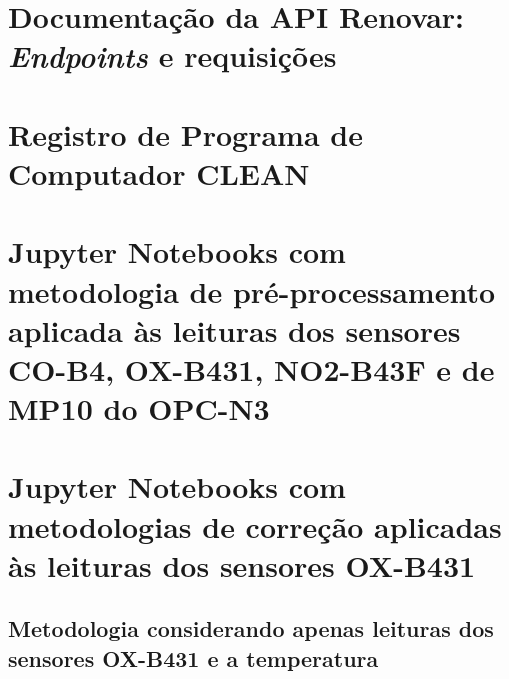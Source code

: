 \chapter{Documentação da API Renovar: \textit{Endpoints} e requisições}
\label{anex:renovar-api}



\chapter{Registro de Programa de Computador CLEAN}
\label{anex:patente}



\chapter{Jupyter Notebooks com metodologia de pré-processamento aplicada às leituras dos sensores CO-B4, OX-B431, NO2-B43F e de MP10 do OPC-N3}
\label{anex:preprocessing-notebooks}








\chapter{Jupyter Notebooks com metodologias de correção aplicadas às leituras dos sensores OX-B431}
\label{anex:calibration-notebooks}

\section{Metodologia considerando apenas leituras dos sensores OX-B431 e a temperatura}

